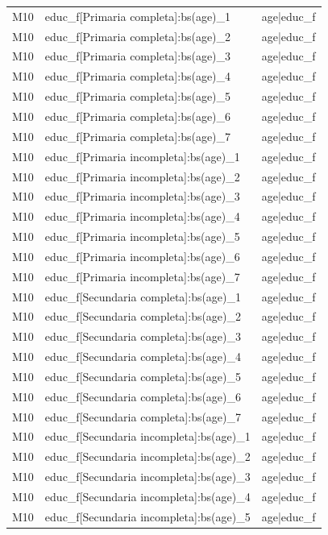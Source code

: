 \begin{longtable}{lll}
M10 & educ\_f[Primaria completa]:bs(age)\_1 & age|educ\_f \\
M10 & educ\_f[Primaria completa]:bs(age)\_2 & age|educ\_f \\
M10 & educ\_f[Primaria completa]:bs(age)\_3 & age|educ\_f \\
M10 & educ\_f[Primaria completa]:bs(age)\_4 & age|educ\_f \\
M10 & educ\_f[Primaria completa]:bs(age)\_5 & age|educ\_f \\
M10 & educ\_f[Primaria completa]:bs(age)\_6 & age|educ\_f \\
M10 & educ\_f[Primaria completa]:bs(age)\_7 & age|educ\_f \\
M10 & educ\_f[Primaria incompleta]:bs(age)\_1 & age|educ\_f \\
M10 & educ\_f[Primaria incompleta]:bs(age)\_2 & age|educ\_f \\
M10 & educ\_f[Primaria incompleta]:bs(age)\_3 & age|educ\_f \\
M10 & educ\_f[Primaria incompleta]:bs(age)\_4 & age|educ\_f \\
M10 & educ\_f[Primaria incompleta]:bs(age)\_5 & age|educ\_f \\
M10 & educ\_f[Primaria incompleta]:bs(age)\_6 & age|educ\_f \\
M10 & educ\_f[Primaria incompleta]:bs(age)\_7 & age|educ\_f \\
M10 & educ\_f[Secundaria completa]:bs(age)\_1 & age|educ\_f \\
M10 & educ\_f[Secundaria completa]:bs(age)\_2 & age|educ\_f \\
M10 & educ\_f[Secundaria completa]:bs(age)\_3 & age|educ\_f \\
M10 & educ\_f[Secundaria completa]:bs(age)\_4 & age|educ\_f \\
M10 & educ\_f[Secundaria completa]:bs(age)\_5 & age|educ\_f \\
M10 & educ\_f[Secundaria completa]:bs(age)\_6 & age|educ\_f \\
M10 & educ\_f[Secundaria completa]:bs(age)\_7 & age|educ\_f \\
M10 & educ\_f[Secundaria incompleta]:bs(age)\_1 & age|educ\_f \\
M10 & educ\_f[Secundaria incompleta]:bs(age)\_2 & age|educ\_f \\
M10 & educ\_f[Secundaria incompleta]:bs(age)\_3 & age|educ\_f \\
M10 & educ\_f[Secundaria incompleta]:bs(age)\_4 & age|educ\_f \\
M10 & educ\_f[Secundaria incompleta]:bs(age)\_5 & age|educ\_f \\

\end{longtable}
